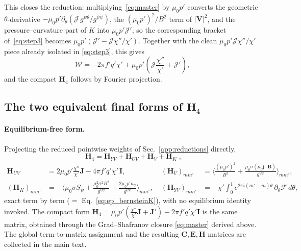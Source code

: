 \documentclass[10pt,a4paper]{article}
\numberwithin{equation}{section}
\begin{document}
This closes the reduction: multiplying~\eqref{eq:master} by $\mu_0p'$
converts the geometric $\theta$-derivative
$-\mu_0p'\partial_\theta(\mathcal J\,g^{\psi\theta}/g^{\psi\psi})$, the
$(\mu_0p')^2/B^2$ term of $|\mathbf V|^2$, and the pressure--curvature part of
$K$ into $\mu_0p'\mathcal J'$, so the corresponding bracket of~\eqref{eq:step3} becomes
$\mu_0p'(\mathcal J'-\mathcal J\chi''/\chi')$.  Together with the clean
\(\mu_0p'\mathcal J\chi''/\chi'\) piece already isolated in
\eqref{eq:step3}, this gives
\[
\mathcal W
=-2\pi f'q'\chi'
+\mu_0p'\left(\mathcal J\frac{\chi''}{\chi'}+\mathcal J'\right),
\]
and the compact $\mathbf H_4$ follows by Fourier projection.

\subsection{The two equivalent final forms of $\mathbf H_4$}

\paragraph{Equilibrium-free form.}
Projecting the reduced pointwise weights of Sec.~\ref{app:reductions} directly,
\begin{equation}
\boxed{\;\mathbf H_4=\mathbf H_{YV}+\mathbf H_{UV}+\mathbf H_V+\mathbf H_K\;,}
\end{equation}
\begin{equation}
\begin{aligned}
\mathbf H_{UV}&=2\mu_0p'\tfrac{\chi''}{\chi'}\mathbf J-4\pi f'q'\chi'\,\mathbf I,
&\;
(\mathbf H_V)_{mm'}&=\Big\langle\tfrac{(\mu_0p')^2}{B^2}+\tfrac{\mu_0\sigma(\mu_0\mathbf j\cdot\mathbf B)}{g^{\psi\psi}}\Big\rangle_{mm'},\\[4pt]
(\mathbf H_K)_{mm'}&=-\Big\langle\mu_0\sigma S_\psi+\tfrac{\mu_0^2\sigma^2B^2}{g^{\psi\psi}}+\tfrac{2\mu_0p'\kappa_\psi}{g^{\psi\psi}}\Big\rangle_{mm'},
&\;
(\mathbf H_{YV})_{mm'}&=-\chi'\!\int_0^1\! e^{2\pi i(m'-m)\theta}\,\partial_\theta\mathcal F\,d\theta,
\end{aligned}
\end{equation}
exact term by term ($=$ Eq.~\eqref{eq:ep_bernsteinK}), with no equilibrium
identity invoked.  The compact form
$\mathbf H_4=\mu_0p'(\tfrac{\chi''}{\chi'}\mathbf J+\mathbf J')-2\pi f'q'\chi'\mathbf I$
is the same matrix, obtained through the
Grad--Shafranov closure \eqref{eq:master} derived above.  The global
term-to-matrix assignment and the resulting $\mathbf C,\mathbf E,\mathbf H$
matrices are collected in the main text.



\end{document}
